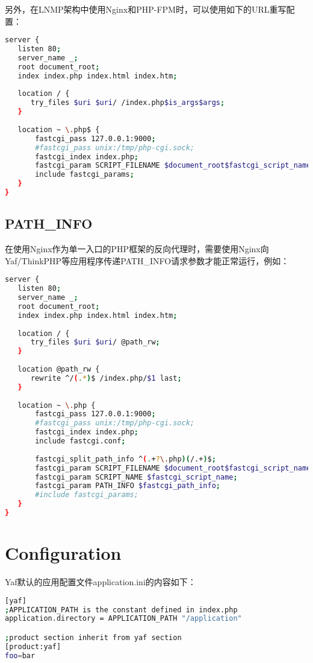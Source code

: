 另外，在LNMP架构中使用Nginx和PHP-FPM时，可以使用如下的URL重写配置：

\begin{lstlisting}[language=bash]
server {
   listen 80;
   server_name _;
   root document_root;
   index index.php index.html index.htm;
   
   location / {
      try_files $uri $uri/ /index.php$is_args$args;
   }
   
   location ~ \.php$ {
       fastcgi_pass 127.0.0.1:9000;
       #fastcgi_pass unix:/tmp/php-cgi.sock;
       fastcgi_index index.php;
       fastcgi_param SCRIPT_FILENAME $document_root$fastcgi_script_name;
       include fastcgi_params;  
   }
}
\end{lstlisting}


\subsection{PATH\_INFO}

在使用Nginx作为单一入口的PHP框架的反向代理时，需要使用Nginx向Yaf/ThinkPHP等应用程序传递PATH\_INFO请求参数才能正常运行，例如：


\begin{lstlisting}[language=bash]
server {
   listen 80;
   server_name _;
   root document_root;
   index index.php index.html index.htm;
   
   location / {
      try_files $uri $uri/ @path_rw;
   }
   
   location @path_rw {
      rewrite ^/(.*)$ /index.php/$1 last;
   }
   
   location ~ \.php {
       fastcgi_pass 127.0.0.1:9000;
       #fastcgi_pass unix:/tmp/php-cgi.sock;
       fastcgi_index index.php;
       include fastcgi.conf;
       
       fastcgi_split_path_info ^(.+?\.php)(/.+)$;
       fastcgi_param SCRIPT_FILENAME $document_root$fastcgi_script_name;
       fastcgi_param SCRIPT_NAME $fastcgi_script_name;
       fastcgi_param PATH_INFO $fastcgi_path_info;
       #include fastcgi_params;  
   }
}
\end{lstlisting}

\section{Configuration}



Yaf默认的应用配置文件application.ini的内容如下：

\begin{lstlisting}[language=bash]
[yaf]
;APPLICATION_PATH is the constant defined in index.php
application.directory = APPLICATION_PATH "/application"

;product section inherit from yaf section
[product:yaf]
foo=bar
\end{lstlisting}

